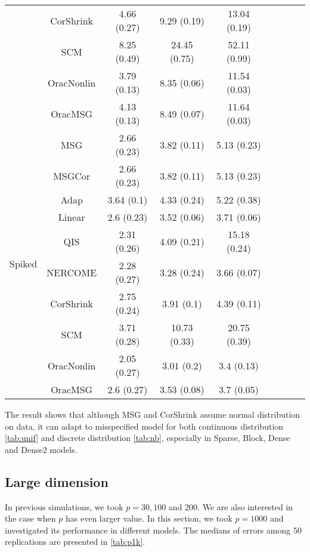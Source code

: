 \documentclass[useAMS,referee,usenatbib]{biom}
\begin{document}
\begin{table}[H]
{\begin{tabular}{ccccccccc}
 & CorShrink      & 4.66 (0.27) & 9.29 (0.19)  & 13.04 (0.19) \\
 & SCM            & 8.25 (0.49) & 24.45 (0.75) & 52.11 (0.99) \\
 & OracNonlin & 3.79 (0.13) & 8.35 (0.06)  & 11.54 (0.03) \\
 & OracMSG  & 4.13 (0.13) & 8.49 (0.07)  & 11.64 (0.03) \\  \midrule
\multirow{10}{*}{Spiked}  
  & MSG & 2.66 (0.23) & 3.82 (0.11)  & 5.13 (0.23)  \\
 & MSGCor   & 2.66 (0.23) & 3.82 (0.11)  & 5.13 (0.23)  \\
 & Adap     & 3.64 (0.1)  & 4.33 (0.24)  & 5.22 (0.38)  \\
 & Linear         & 2.6 (0.23)  & 3.52 (0.06)  & 3.71 (0.06)  \\
 & QIS            & 2.31 (0.26) & 4.09 (0.21)  & 15.18 (0.24) \\
 & NERCOME        & 2.28 (0.27) & 3.28 (0.24)  & 3.66 (0.07)  \\
 & CorShrink      & 2.75 (0.24) & 3.91 (0.1)   & 4.39 (0.11)  \\
 & SCM            & 3.71 (0.28) & 10.73 (0.33) & 20.75 (0.39) \\
 & OracNonlin & 2.05 (0.27) & 3.01 (0.2)   & 3.4 (0.13)   \\
 & OracMSG  & 2.6 (0.27)  & 3.53 (0.08)  & 3.7 (0.05)  \\ \bottomrule
\end{tabular}%
}
\end{table}
The result shows that although MSG and CorShrink assume normal distribution on data, it can adapt to misspecified model for both continuous distribution \ref{tab:unif} and discrete distribution \ref{tab:nb}, especially in Sparse, Block, Dense and Dense2 models.

\subsection{Large dimension}
In previous simulations, we took $p=30,100$ and 200. We are also interested in the case when $p$ has even larger value. In this section, we took $p=1000$ and investigated its performance in different models. The medians of errors among 50 replications are presented in \ref{tab:p1k}. 
\end{document}
